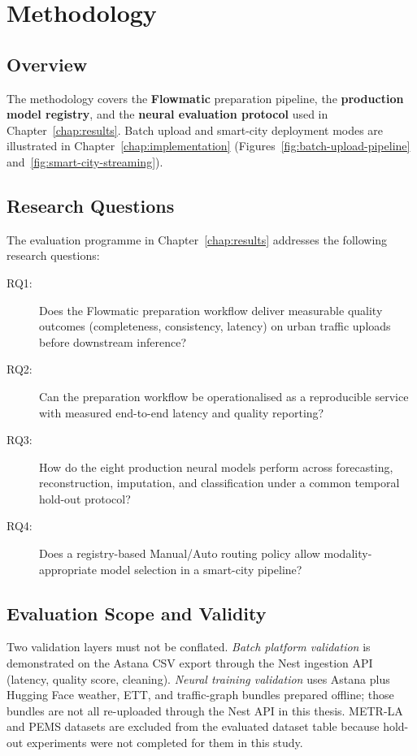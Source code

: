 %
%

\chapter{Methodology}
\label{chap:methodology}

\section{Overview}

The methodology covers the \textbf{Flowmatic} preparation pipeline, the \textbf{production model registry}, and the \textbf{neural evaluation protocol} used in Chapter~\ref{chap:results}. Batch upload and smart-city deployment modes are illustrated in Chapter~\ref{chap:implementation} (Figures~\ref{fig:batch-upload-pipeline} and~\ref{fig:smart-city-streaming}).

\section{Research Questions}
\label{sec:research_questions}

The evaluation programme in Chapter~\ref{chap:results} addresses the following research questions:
\begin{description}
  \item[RQ1:] Does the Flowmatic preparation workflow deliver measurable quality outcomes (completeness, consistency, latency) on urban traffic uploads before downstream inference?
  \item[RQ2:] Can the preparation workflow be operationalised as a reproducible service with measured end-to-end latency and quality reporting?
  \item[RQ3:] How do the eight production neural models perform across forecasting, reconstruction, imputation, and classification under a common temporal hold-out protocol?
  \item[RQ4:] Does a registry-based Manual/Auto routing policy allow modality-appropriate model selection in a smart-city pipeline?
\end{description}

\section{Evaluation Scope and Validity}
\label{sec:evaluation_scope}

Two validation layers must not be conflated. \emph{Batch platform validation} is demonstrated on the Astana CSV export through the Nest ingestion API (latency, quality score, cleaning). \emph{Neural training validation} uses Astana plus Hugging Face weather, ETT, and traffic-graph bundles prepared offline; those bundles are not all re-uploaded through the Nest API in this thesis. METR-LA and PEMS datasets are excluded from the evaluated dataset table because hold-out experiments were not completed for them in this study.

